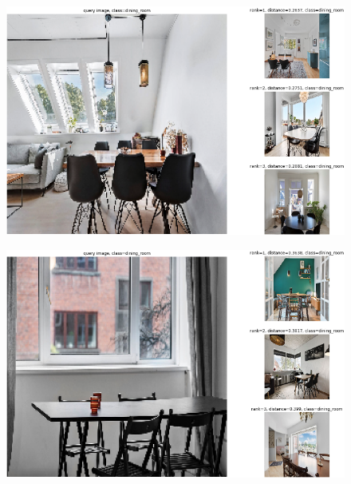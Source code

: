 \begin{figure}[H]
    \centering
    \includegraphics[width =\textwidth]{pictures/random/resnet50diningplot}
\end{figure}

\begin{figure}[H]
    \centering
    \includegraphics[width =\textwidth]{pictures/random/resnet50diningplot1}
\end{figure}

